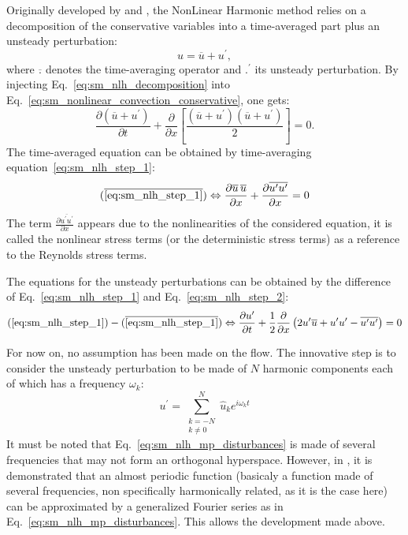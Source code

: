 Originally developed by \citet{He1998} and \citet{Ning1998}, the 
NonLinear Harmonic method
relies on a decomposition of the conservative variables into a
time-averaged part plus an unsteady perturbation:
\begin{equation}
	u = \overline{u} + u^\prime,
	\label{eq:sm_nlh_decomposition}
\end{equation}
where $\overline{.}$ denotes the time-averaging operator and
$.^\prime$ its unsteady perturbation.
By injecting Eq.~\ref{eq:sm_nlh_decomposition} into
Eq.~\ref{eq:sm_nonlinear_convection_conservative}, one gets:
\begin{equation}
	\frac{\partial \left( \overline{u} + u^\prime \right)}{\partial t} + 
	\frac{\partial}{\partial x} \left[\frac{
		\left( \overline{u} + u^\prime\right)
		\left( \overline{u} + u^\prime\right)}{2}\right] = 
	0.
	\label{eq:sm_nlh_step_1}
\end{equation}
The time-averaged equation can be obtained by time-averaging
equation~\ref{eq:sm_nlh_step_1}:
\begin{equation}
	(\overline{\ref{eq:sm_nlh_step_1}})
	\Leftrightarrow
	\frac{\partial \overline{u} \, \overline{u}}{\partial x} +
	\frac{\partial \overline{u^\prime u^\prime}}{\partial x} =
	0
	\label{eq:sm_nlh_step_2}
\end{equation}
The term $\frac{\partial \overline{u^\prime u^\prime}}{\partial x}$
appears due to the nonlinearities of the considered equation, it
is called the nonlinear stress terms 
(or the deterministic stress terms) as a reference to 
the Reynolds stress terms.

The equations for the unsteady perturbations can be obtained by
the difference of Eq.~\ref{eq:sm_nlh_step_1}
and Eq.~\ref{eq:sm_nlh_step_2}:
\begin{equation}
	(\ref{eq:sm_nlh_step_1}) - (\overline{\ref{eq:sm_nlh_step_1}})
	\Leftrightarrow
	\frac{\partial u^\prime}{\partial t} +
	\frac{1}{2} \frac{\partial}{\partial x} \left(
		2 u^\prime \overline{u} + 
		u^\prime u^\prime - 
		\overline{u^\prime u^\prime}\right) =
	0
	\label{eq:sm_nlh_step_3}
\end{equation}

For now on, no assumption has been made on the flow. The innovative step
is to consider the unsteady perturbation to be made of $N$
harmonic components each of which has a frequency $\omega_k$:
\begin{equation}
	u^\prime =
	\sum_{\substack{k=-N \\ k \neq 0}}^{N} \widehat{u}_k e^{i \omega_k t}
	\label{eq:sm_nlh_mp_disturbances}
\end{equation}
It must be noted that Eq.~\ref{eq:sm_nlh_mp_disturbances} 
is made of several frequencies that may not form an orthogonal
hyperspace. However, in \citet{Besicovitch1932}, it is demonstrated
that an almost periodic function (basicaly a function made of 
several frequencies, non specifically harmonically related, as it
is the case here) can be approximated by a generalized Fourier
series as in Eq.~\ref{eq:sm_nlh_mp_disturbances}. This allows the
development made above.







